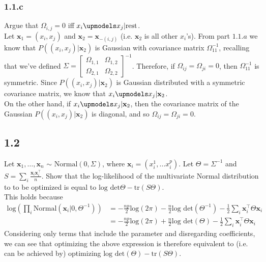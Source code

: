 \documentclass[12pt]{article}
\begin{document}
\subsubsection*{1.1.c}
Argue that $\Omega_{i,j}=0$ iff $x_i \upmodels x_j | \text{rest}$.\\

Let $\textbf{x}_1 = (x_i,x_j)$ and $\textbf{x}_2 = \textbf{x}_{-(i,j)}$ (i.e. $\textbf{x}_2$ is all other $x_i$'s).
From part $1.1.a$ we know that $P((x_i,x_j) | \textbf{x}_2)$ is Gaussian with covariance matrix $\Omega_{11}^{-1}$, recalling that we've defined $\Sigma = \left[ \begin{smallmatrix} \Omega_{1,1}& \Omega_{1,2} \\ \Omega_{2,1} & \Omega_{2,2} \end{smallmatrix} \right]^{-1}$. Therefore, if $\Omega_{ij} = \Omega_{ji} = 0$, then $\Omega_{11}^{-1}$ is symmetric. Since $P((x_i,x_j) | \textbf{x}_2)$ is Gaussian distributed with a symmetric covariance matrix, we know that $x_i \upmodels x_j | \textbf{x}_2$. \\

On the other hand, if $x_i \upmodels x_j | \textbf{x}_2$, then the covariance matrix of the Gaussian $P((x_i,x_j) | \textbf{x}_2)$ is diagonal, and so $\Omega_{ij} = \Omega_{ji} = 0$.


\subsection*{1.2}
Let $\textbf{x}_1, \ldots, \textbf{x}_n$ $\sim$ $\text{Normal}(0,\Sigma)$, where $\textbf{x}_i = (x_i^1, \ldots x_i^p)$. Let $\Theta = \Sigma^{-1}$ and $S = \sum_i \frac{\textbf{x}_i \textbf{x}_i^\top}{n}$. Show that the log-likelihood of the multivariate Normal distribution to to be optimized is equal to $\text{log} \text{ det} \Theta - \text{tr}(S\Theta)$.\\

This holds because 
\begin{equation}
    \begin{split}
        \text{log} \left( \prod_i \text{Normal}(\textbf{x}_i | 0,\Theta^{-1}) \right) 
        &= -\frac{np}{2}\text{log}(2\pi) - \frac{n}{2} \text{log} \text{ det}(\Theta^{-1}) - \frac{1}{2} \sum_i \textbf{x}_i^{\top} \Theta \textbf{x}_i\\
        &= -\frac{np}{2}\text{log}(2\pi) + \frac{n}{2} \text{log} \text{ det}(\Theta) - \frac{1}{2} \sum_i \textbf{x}_i^{\top} \Theta \textbf{x}_i
    \end{split}
\end{equation}
Considering only terms that include the parameter and disregarding coefficients, we can see that optimizing the above expression is therefore equivalent to (i.e. can be achieved by) optimizing $\text{log} \text{ det}(\Theta) - \text{tr}(S\Theta)$.
\end{document}
